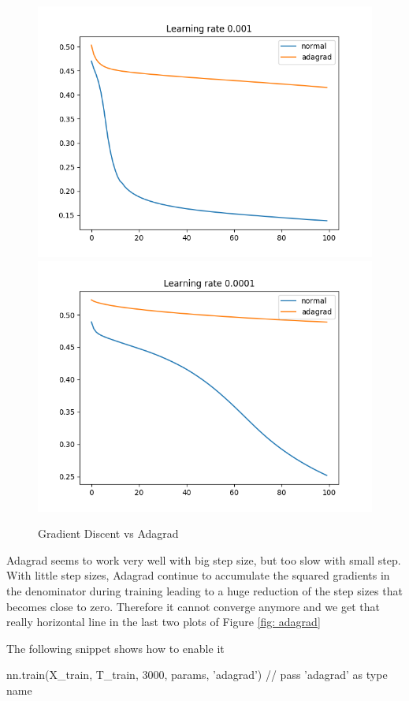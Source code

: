 \documentclass[11pt]{article}
\begin{document}
\begin{figure}[H]
\includegraphics[scale=0.5]{images/adagrad_plot_0,001.png}	
\includegraphics[scale=0.5]{images/adagrad_plot_0,0001.png}	
\caption{Gradient Discent vs Adagrad}
\end{figure}
Adagrad seems to work very well with big step size, but too slow with small step. With little step sizes, Adagrad continue to accumulate the squared gradients in the denominator during training leading to a huge reduction of the step sizes that becomes close to zero. Therefore it cannot converge anymore and we get that really horizontal line in the last two plots of Figure \ref{fig: adagrad}

The following snippet shows how to enable it
\begin{python}
nn.train(X_train, T_train, 3000, params, 'adagrad') // pass 'adagrad' as type name
\end{python}
\end{document}
